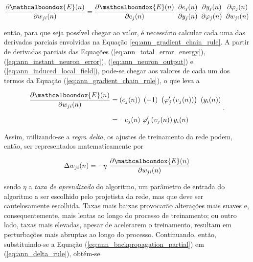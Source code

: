 \begin{equation}
    \dfrac{\partial \mathcalboondox{E}(n)}{\partial w_{ji}(n)} = \dfrac{\partial \mathcalboondox{E}(n)}{\partial e_{j}(n)}\ \dfrac{\partial e_{j}(n)}{\partial y_{j}(n)}\ \dfrac{\partial y_{j}(n)}{\partial \varphi_{j}(n)}\ \dfrac{\partial \varphi_{j}(n)}{\partial w_{ji}(n)}
    \label{eq:ann_gradient_chain_rule}
    \vspace{0.2cm}
\end{equation}

\noindent então, para que seja possível chegar ao valor, é necessário calcular cada uma das derivadas parciais envolvidas na Equação \ref{eq:ann_gradient_chain_rule}. A partir de derivadas parciais das Equações (\ref{eq:ann_total_error_energy}), (\ref{eq:ann_instant_neuron_error}), (\ref{eq:ann_neuron_output}) e (\ref{eq:ann_induced_local_field}), pode-se chegar aos valores de cada um dos termos da Equação (\ref{eq:ann_gradient_chain_rule}), o que leva a

\begin{equation}
    \setlength{\jot}{10pt}
    \begin{align}
    \dfrac{\partial \mathcalboondox{E}(n)}{\partial w_{ji}(n)} & = \left(e_{j}(n)\right)\ \left(-1\right)\ \left(\varphi_{j}'\left(\upsilon_{j}(n)\right)\right)\ \left(y_{i}(n)\right)\\
     & = -e_{j}(n)\ \varphi_{j}'\left(\upsilon_{j}(n)\right) y_{i}(n)
    \end{align}
    \label{eq:ann_backpropagation_partial}
    \hspace{0.1cm}.
    \vspace{0.2cm}
\end{equation}

Assim, utilizando-se a \textit{regra delta}, os ajustes de treinamento da rede podem, então, ser representados matematicamente por

\begin{equation}
    \Delta w_{ji}(n) = - \eta\ \dfrac{\partial \mathcalboondox{E}(n)}{\partial w_{ji}(n)}
    \label{eq:ann_delta_rule}
    \vspace{0.2cm}
\end{equation}

\noindent sendo $\eta$ a \textit{taxa de aprendizado} do algoritmo, um parâmetro de entrada do algoritmo a ser escolhido pelo projetista da rede, mas que deve ser cautelosamente escolhida. Taxas mais baixas provocarão alterações mais suaves e, consequentemente, mais lentas ao longo do processo de treinamento; ou outro lado, taxas mais elevadas, apesar de acelerarem o treinamento, resultam em perturbações mais abruptas ao longo do processo. Continuando, então, substituindo-se a Equação (\ref{eq:ann_backpropagation_partial}) em (\ref{eq:ann_delta_rule}), obtém-se

